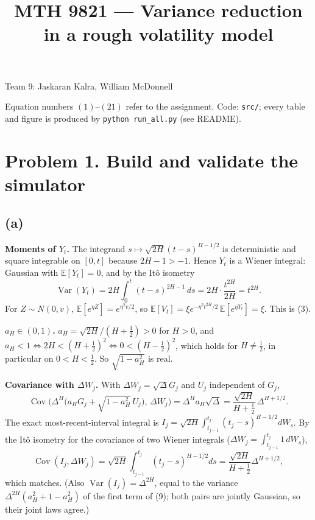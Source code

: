 \documentclass[10pt]{article}
\title{MTH 9821 --- Variance reduction in a rough volatility model}
\author{}
\date{}
\newcommand{\E}{\mathbb{E}}
\newcommand{\Var}{\operatorname{Var}}
\newcommand{\Cov}{\operatorname{Cov}}
\begin{document}
\maketitle
\vspace{-1.2cm}
\begin{center}
Team 9: Jaskaran Kalra, William McDonnell
\end{center}

Equation numbers $(1)$--$(21)$ refer to the assignment. Code: \texttt{src/}; every table and
figure is produced by \texttt{python run\_all.py} (see README).

\section*{Problem 1. Build and validate the simulator}

\subsection*{(a)}
\textbf{Moments of $Y_t$.} The integrand $s\mapsto\sqrt{2H}(t-s)^{H-1/2}$ is deterministic and
square integrable on $[0,t]$ because $2H-1>-1$. Hence $Y_t$ is a Wiener integral: Gaussian with
$\E[Y_t]=0$, and by the It\^o isometry
\[
\Var(Y_t)=2H\int_0^t (t-s)^{2H-1}\,ds = 2H\cdot\frac{t^{2H}}{2H}=t^{2H}.
\]
For $Z\sim N(0,v)$, $\E[e^{\eta Z}]=e^{\eta^2 v/2}$, so
$\E[V_t]=\xi e^{-\eta^2t^{2H}/2}\,\E[e^{\eta Y_t}]=\xi$. This is (3).

\textbf{$a_H\in(0,1)$.} $a_H=\sqrt{2H}/(H+\tfrac12)>0$ for $H>0$, and
$a_H<1\iff 2H<(H+\tfrac12)^2\iff 0<(H-\tfrac12)^2$, which holds for $H\neq\tfrac12$, in
particular on $0<H<\tfrac12$. So $\sqrt{1-a_H^2}$ is real.

\textbf{Covariance with $\Delta W_j$.} With $\Delta W_j=\sqrt\Delta G_j$ and $U_j$ independent of $G_j$,
\[
\Cov\!\Big(\Delta^H\big(a_HG_j+\sqrt{1-a_H^2}\,U_j\big),\,\Delta W_j\Big)=\Delta^H a_H\sqrt\Delta
=\frac{\sqrt{2H}}{H+\tfrac12}\,\Delta^{H+1/2}.
\]
The exact most-recent-interval integral is $I_j=\sqrt{2H}\int_{t_{j-1}}^{t_j}(t_j-s)^{H-1/2}dW_s$.
By the It\^o isometry for the covariance of two Wiener integrals ($\Delta W_j=\int_{t_{j-1}}^{t_j}1\,dW_s$),
\[
\Cov(I_j,\Delta W_j)=\sqrt{2H}\int_{t_{j-1}}^{t_j}(t_j-s)^{H-1/2}ds=\frac{\sqrt{2H}}{H+\tfrac12}\Delta^{H+1/2},
\]
which matches. (Also $\Var(I_j)=\Delta^{2H}$, equal to the variance $\Delta^{2H}(a_H^2+1-a_H^2)$ of
the first term of (9); both pairs are jointly Gaussian, so their joint laws agree.)
\end{document}
